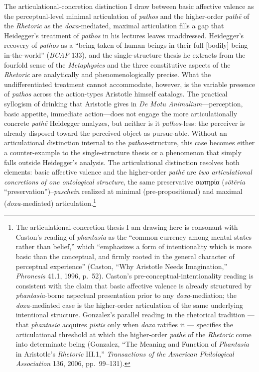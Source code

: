 \documentclass{article}
\newcommand{\gk}[1]{{\greekfont #1}}
\begin{document}
The articulational-concretion distinction I draw between basic affective valence as the perceptual-level minimal articulation of \textit{pathos} and the higher-order \textit{pathē} of the \textit{Rhetoric} as the \textit{doxa}-mediated, maximal articulation fills a gap that Heidegger's treatment of \textit{pathos} in his lectures leaves unaddressed. Heidegger's recovery of \textit{pathos} as a ``being-taken of human beings in their full [bodily] being-in-the-world'' (\textit{BCAP} 133), and the single-structure thesis he extracts from the fourfold sense of the \textit{Metaphysics} and the three constitutive aspects of the \textit{Rhetoric} are analytically and phenomenologically precise. What the undifferentiated treatment cannot accommodate, however, is the variable presence of \textit{pathos} across the action-types Aristotle himself catalogs. The practical syllogism of drinking that Aristotle gives in \textit{De Motu Animalium}---perception, basic appetite, immediate action---does not engage the more articulationally concrete \textit{pathē} Heidegger analyzes, but neither is it \textit{pathos}-less: the perceiver is already disposed toward the perceived object as pursue-able. Without an articulational distinction internal to the \textit{pathos}-structure, this case becomes either a counter-example to the single-structure thesis or a phenomenon that simply falls outside Heidegger's analysis. The articulational distinction resolves both elements: basic affective valence and the higher-order \textit{pathē} are \textit{two articulational concretions of one ontological structure}, the same preservative \gk{σωτηρία} (\textit{sōtēria} ``preservation'')--\textit{paschein} realized at minimal (pre-propositional) and maximal (\textit{doxa}-mediated) articulation.\footnote{The articulational-concretion thesis I am drawing here is consonant with Caston's reading of \textit{phantasia} as the ``common currency among mental states rather than belief,'' which ``emphasizes a form of intentionality which is more basic than the conceptual, and firmly rooted in the general character of perceptual experience'' (Caston, ``Why Aristotle Needs Imagination,'' \textit{Phronesis} 41.1, 1996, p.~52). Caston's pre-conceptual-intentionality reading is consistent with the claim that basic affective valence is already structured by \textit{phantasia}-borne aspectual presentation prior to any \textit{doxa}-mediation; the \textit{doxa}-mediated case is the higher-order articulation of the same underlying intentional structure. Gonzalez's parallel reading in the rhetorical tradition --- that \textit{phantasia} acquires \textit{pistis} only when \textit{doxa} ratifies it --- specifies the articulational threshold at which the higher-order \textit{pathē} of the \textit{Rhetoric} come into determinate being (Gonzalez, ``The Meaning and Function of \textit{Phantasia} in Aristotle's \textit{Rhetoric} III.1,'' \textit{Transactions of the American Philological Association} 136, 2006, pp.~99--131).}
\end{document}
